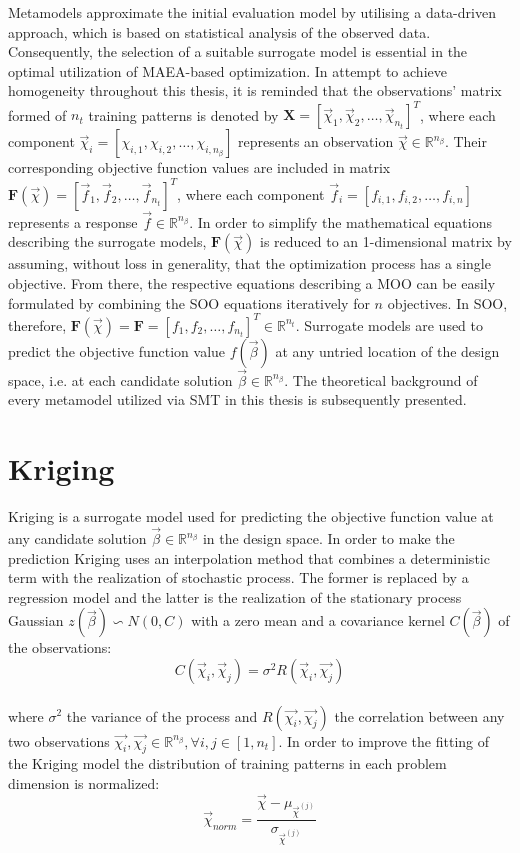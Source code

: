 \label{chapter:models}
Metamodels approximate the initial evaluation model by 
utilising a data-driven approach, which is based on 
statistical analysis of the observed data. Consequently, the 
selection of a suitable surrogate model is essential in the optimal 
utilization of MAEA-based optimization. In attempt to achieve 
homogeneity throughout this thesis, it is reminded that 
the observations' matrix formed of $n_{t}$ training 
patterns is denoted by $\mathbf{X} = [\vec{χ}_{1}, 
\vec{χ}_{2}, \hdots, \vec{χ}_{n_{t}}]^T$, where each 
component $\vec{χ}_{i} = [χ_{i,1}, χ_{i,2},\hdots, 
χ_{i,n_{β}}]$ represents an observation $\vec{χ} \in \mathbb{R}
^{n_{β}}$. Their corresponding objective function
values are included in matrix $\mathbf{F}(\vec{χ}) = 
[\vec{f}_{1}, \vec{f}_{2}, \hdots, \vec{f}_{n_{t}}]^{Τ}$, 
where each component $\vec{f}_{i} = [f_{i,1}, f_{i,2}, 
\hdots, f_{i,n}]$ represents a response $\vec{f} \in 
\mathbb{R}^{n_{β}}$. In order to simplify the mathematical 
equations describing the surrogate models, $\mathbf{F}
(\vec{χ})$ is reduced to an 1-dimensional matrix  by 
assuming, without loss in generality, that the optimization 
process has a single objective. From there, the 
respective equations describing a MOO can be easily formulated by 
combining the SOO equations iteratively for $n$ objectives. In 
SOO, therefore, $\mathbf{F}(\vec{χ}) \!= \!\mathbf{F} \!= [f_{1}, 
f_{2}, \hdots, f_{n_{t}} ]^{T} \!\in \!\mathbb{R}^{n_{t}}$. 
Surrogate models are used to predict the objective function value 
$f(\vec{β})$ at any untried location of the design space, i.e. at 
each candidate solution $\vec{β} \in \mathbb{R}^{n_{β}}$. 
The theoretical background of every metamodel utilized via SMT in 
this thesis is subsequently presented. 


\vfill
\section{Kriging}
Kriging\cite{Kriging} is a surrogate model used for 
predicting the objective function value at any candidate
solution $\vec{β} \in \mathbb{R}^{n_{β}}$ in the design space. 
In order to make the prediction Kriging uses an interpolation 
method that combines a deterministic term with the realization of 
stochastic process. The former is replaced by a regression model 
and the latter is the realization of the stationary process 
Gaussian $z(\vec{β}) \!\backsim \!N(0,C)$ with a zero mean 
and a covariance kernel $C(\vec{β})$ of the observations:
\begin{equation}
C(\vec{χ}_{i}, \vec{χ}_{j}) = σ^{2} R(\vec{χ}_{i}, \vec{χ_{j}})
\end{equation} 
\\[-0.5cm]
where $σ^2$ the variance of the process and $R( \vec{χ_{i}}, 
\vec{χ_{j}})$ the correlation between any two observations
$\vec{χ_{i}}, \vec{χ_{j}} \!\in \!\mathbb{R}^{n_{β}}, \forall i,j 
\in [1,n_{t}]$. In order to improve the fitting of the Kriging 
model the distribution of training patterns in each problem 
dimension is normalized:
\begin{equation}
\vec{χ}_{norm} = \dfrac{\vec{χ} - μ_{\vec{χ}^{(j)}} }
{σ_{\vec{χ}^{(j)}}}
\end{equation} 

